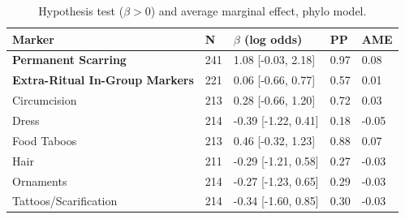 \begin{table}[!ht]
\centering
\small
\caption{Hypothesis test ($\beta > 0$) and average marginal effect, phylo model.}
\label{tab:int_hypothesis_ame_phylo}
\begin{tabular}{lllll}
\toprule
Marker & N & $\beta$ (log odds) & PP & AME \\
\midrule
\textbf{Permanent Scarring} & 241 & 1.08 [-0.03, 2.18] & 0.97 & 0.08 \\
\textbf{Extra-Ritual In-Group Markers} & 221 & 0.06 [-0.66, 0.77] & 0.57 & 0.01 \\
\midrule
Circumcision & 213 & 0.28 [-0.66, 1.20] & 0.72 & 0.03 \\
Dress & 214 & -0.39 [-1.22, 0.41] & 0.18 & -0.05 \\
Food Taboos & 213 & 0.46 [-0.32, 1.23] & 0.88 & 0.07 \\
Hair & 211 & -0.29 [-1.21, 0.58] & 0.27 & -0.03 \\
Ornaments & 214 & -0.27 [-1.23, 0.65] & 0.29 & -0.03 \\
Tattoos/Scarification & 214 & -0.34 [-1.60, 0.85] & 0.30 & -0.03 \\
\bottomrule
\end{tabular}
\end{table}